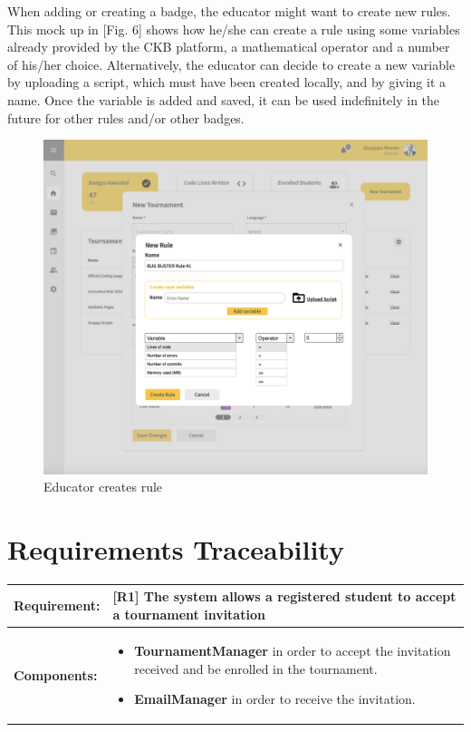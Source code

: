 \documentclass[12pt,oneside,a4paper]{article}
\begin{document}
\begin{flushleft}
When adding or creating a badge, the educator might want to create new rules. This mock up in [Fig. 6] shows how he/she can create a rule using some variables already provided by the CKB platform, a mathematical operator and a number of his/her choice. Alternatively, the educator can decide to create a new variable by uploading a script, which must have been created locally, and by giving it a name. Once the variable is added and saved, it can be used indefinitely in the future for other rules and/or other badges.
\end{flushleft}
\begin{figure}[htbp]
    \centering
    \includegraphics[width=1\linewidth]{Images/Interfaces/CreateRule.PNG}
    \caption{Educator creates rule}
    \label{fig:enter-label}
\end{figure}
\clearpage

\section{Requirements Traceability}

\begin{table}[htbp]
\begin{tabular}{|l|p{12cm}|}
    \hline
    \textbf{Requirement:} & [R1] The system allows a registered student to accept a tournament invitation\\
    \hline
    \textbf{Components:} & \begin{itemize}
        \item \textbf{TournamentManager} in order to accept the invitation received and be enrolled in the tournament.
        \item \textbf{EmailManager} in order to receive the invitation.
    \end{itemize}\\
    \hline
\end{tabular}
\end{table}
\end{document}
